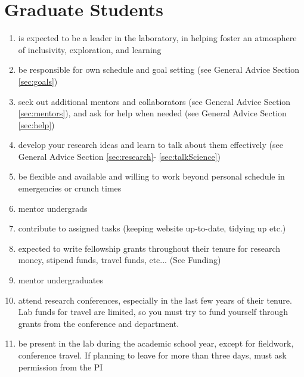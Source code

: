 \documentclass[12pt]{article}
\begin{document}
\section{Graduate Students}
\begin{enumerate}
\item is expected to be a leader in the laboratory, in helping foster
  an atmosphere of inclusivity, exploration, and  learning
\item be responsible for own schedule and goal setting (see General Advice
  Section \ref{sec:goals})
\item seek out additional mentors and collaborators (see General
  Advice Section \ref{sec:mentors}), and ask for help when needed (see
  General Advice Section \ref{sec:help})
\item develop your research ideas and learn to talk about them
  effectively (see General Advice Section \ref{sec:research}-
  \ref{sec:talkScience})
\item be flexible and available and willing to work beyond personal
  schedule in emergencies or crunch times
\item mentor undergrads
\item contribute to assigned tasks (keeping website up-to-date,
  tidying up etc.)
\item expected to write fellowship grants throughout their tenure for
  research money, stipend funds, travel funds, etc... (See Funding)
\item mentor undergraduates
\item attend research conferences, especially in the last few years of
  their tenure. Lab funds for travel are limited, so you must try to
  fund yourself through grants from the conference and department.
\item be present in the lab during the academic school year, except
  for fieldwork, conference travel. If planning to leave for more than
  three days, must ask permission from the PI
\end{enumerate}
\end{document}
